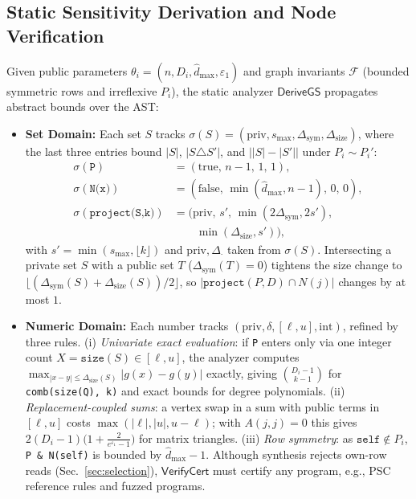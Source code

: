 \documentclass[conference]{IEEEtran}
\theoremstyle{ieeeitalic}
\newcommand{\dhatmax}{\hat{d}_{\max}}
\newcommand{\DeriveGS}{\mathsf{DeriveGS}}
\newcommand{\VerifyCert}{\mathsf{VerifyCert}}
\begin{document}
\subsection{Static Sensitivity Derivation and Node Verification}
\label{sec:cert}

Given public parameters $\theta_i = (n, D_i, \dhatmax, \varepsilon_1)$ and graph invariants $\mathcal{F}$ (bounded symmetric rows and irreflexive $P_i$), the static analyzer $\DeriveGS$ propagates abstract bounds over the AST:
\begin{itemize}
    \item \textbf{Set Domain:} Each set $S$ tracks $\sigma(S) = (\mathrm{priv}, s_{\max}, \Delta_{\mathrm{sym}}, \Delta_{\mathrm{size}})$, where the last three entries bound $|S|$, $|S \triangle S'|$, and $\bigl||S|-|S'|\bigr|$ under $P_i \sim P_i'$:
    \begin{equation*}
    \begin{aligned}
    \sigma(\texttt{P}) &= (\mathrm{true},\, n-1,\, 1,\, 1), \\
    \sigma(\texttt{N(x)}) &= (\mathrm{false},\, \min(\dhatmax, n-1),\, 0,\, 0), \\
    \sigma(\texttt{project(S,k)}) &= (\mathrm{priv},\, s',\, \min(2\Delta_{\mathrm{sym}}, 2s'), \\
    &\qquad \min(\Delta_{\mathrm{size}}, s')),
    \end{aligned}
    \end{equation*}
    with $s' = \min(s_{\max}, \lfloor k \rfloor)$ and $\mathrm{priv}, \Delta_{\cdot}$ taken from $\sigma(S)$. Intersecting a private set $S$ with a public set $T$ ($\Delta_{\mathrm{sym}}(T)=0$) tightens the size change to $\lfloor (\Delta_{\mathrm{sym}}(S) + \Delta_{\mathrm{size}}(S))/2 \rfloor$, so $|\texttt{project}(P, D) \cap N(j)|$ changes by at most $1$.
    \item \textbf{Numeric Domain:} Each number tracks $(\mathrm{priv}, \delta, [\ell, u], \mathrm{int})$, refined by three rules.
    (i) \emph{Univariate exact evaluation}: if \texttt{P} enters only via one integer count $X = \texttt{size}(S) \in [\ell, u]$, the analyzer computes $\max_{|x-y|\le \Delta_{\mathrm{size}}(S)} |g(x)-g(y)|$ exactly, giving $\binom{D_i-1}{k-1}$ for \texttt{comb(size(Q), k)} and exact bounds for degree polynomials.
    (ii) \emph{Replacement-coupled sums}: a vertex swap in a sum with public terms in $[\ell, u]$ costs $\max(|\ell|, |u|, u-\ell)$; with $A(j,j)=0$ this gives $2(D_i-1)\bigl(1 + \tfrac{2}{e^{\varepsilon_1}-1}\bigr)$ for matrix triangles.
    (iii) \emph{Row symmetry}: as $\texttt{self} \notin P_i$, \texttt{P \& N(self)} is bounded by $\dhatmax - 1$. Although synthesis rejects own-row reads (Sec.~\ref{sec:selection}), $\VerifyCert$ must certify any program, e.g., PSC reference rules and fuzzed programs.
\end{itemize}
\end{document}
